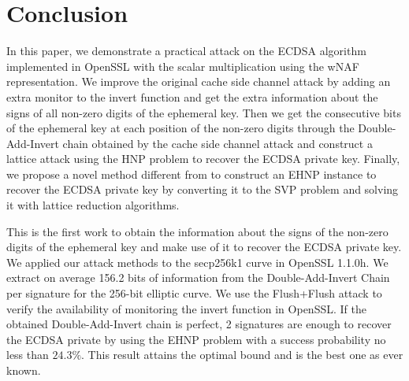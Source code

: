 \section{Conclusion}
\label{sec:conclusion}
In this paper, we demonstrate a practical attack on the ECDSA algorithm implemented in OpenSSL with the scalar multiplication using the wNAF representation.
We improve the original cache side channel attack
 by adding an extra monitor to the invert function and get the extra information about the signs of all non-zero digits of the ephemeral key.
Then we get the consecutive bits of the ephemeral key at each position of the non-zero digits through the Double-Add-Invert chain obtained by the cache side channel attack and
construct a lattice attack using the HNP problem to recover the ECDSA private key.
Finally, we propose a novel method different from \cite{Fan2016} to construct an EHNP instance to recover the ECDSA private
key by converting it to the SVP problem and solving it with lattice reduction algorithms.

This is the first work to obtain the information about the signs of the non-zero digits of the ephemeral key and make use of it to recover the ECDSA private key.
We applied our attack methods to the secp256k1 curve in OpenSSL 1.1.0h.
We extract on average 156.2 bits of information from the Double-Add-Invert Chain per signature for the 256-bit elliptic curve. We use the Flush+Flush attack to verify the availability of monitoring the invert function in OpenSSL.
If the obtained Double-Add-Invert chain is perfect,
2 signatures are enough to recover the ECDSA private by using the EHNP problem with a success probability no less than $24.3\%$.
This result attains the optimal bound and is the best one as ever known.






